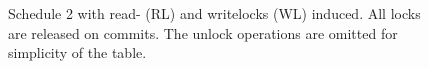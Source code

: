 \begin{figure}[h!]
\footnotesize
\centering

\caption{Schedule 2 with read- (RL) and writelocks (WL) induced. All locks are
released on commits. The unlock operations are omitted for simplicity of the
table.}
\label{fig:schedule2-2pl}
\end{figure}
